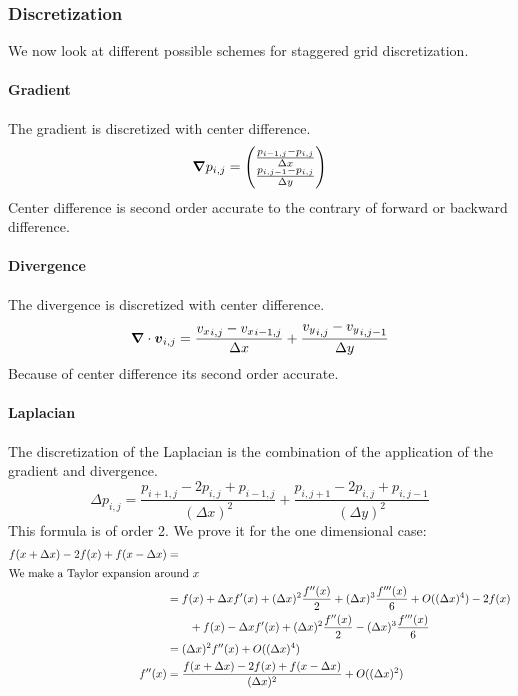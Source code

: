 \subsubsection{Discretization}

We now look at different possible schemes for staggered grid discretization.

\paragraph{Gradient}
\label{fixed:gradient}

The gradient is discretized with center difference.
\begin{equation}
  {\boldsymbol {\nabla}}p_{i,j}=\begin{pmatrix}
                       	\frac{p_{i-1,j}-p_{i,j}}{\Delta x}\\
                       	\frac{p_{i,j-1}-p_{i,j}}{\Delta y}\\
                       \end{pmatrix}
\end{equation}
Center difference is second order accurate to the contrary of forward or backward difference.

\paragraph{Divergence}
\label{fixed:divergence}

The divergence is discretized with center difference.
\begin{equation}
	{\boldsymbol {\nabla}}\cdot {\boldsymbol {v}}_{i,j}=\frac{{v_{x}}_{i,j}-{v_{x}}_{i-1,j}}{\Delta x}+\frac{{v_{y}}_{i,j}-{v_{y}}_{i,j-1}}{\Delta y}
\end{equation}
Because of center difference its second order accurate.

\paragraph{Laplacian}
\label{fixed:Laplacian}

The discretization of the Laplacian is the combination of the application of the gradient and divergence.
\begin{equation}
  \Delta p_{i,j}=\frac{p_{i+1,j}-2p_{i,j}+p_{i-1,j}}{(\Delta x)^2}+\frac{p_{i,j+1}-2p_{i,j}+p_{i,j-1}}{(\Delta y)^2}
\end{equation}
This formula is of order 2.
We prove it for the one dimensional case:
\begin{align*}
  f(x+\Delta x)-2f(x)+f(x-\Delta x)&=\\
  \intertext{We make a Taylor expansion around $x$}
  &=f(x)+\Delta x f'(x) +(\Delta x)^2 \frac{f''(x)}{2}+(\Delta x)^3 \frac{f'''(x)}{6}+O((\Delta x)^4)-2f(x)\\
  &\qquad+f(x)-\Delta x f'(x) +(\Delta x)^2 \frac{f''(x)}{2}-(\Delta x)^3 \frac{f'''(x)}{6}\\
  &=(\Delta x)^2f''(x) +O((\Delta x)^4)\\
  f''(x)&=\frac{f(x+\Delta x)-2f(x)+f(x-\Delta x)}{(\Delta x)^2}+O((\Delta x)^2)
\end{align*}

